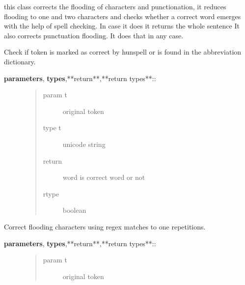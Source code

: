 \documentclass[letterpaper,10pt,english]{sphinxmanual}
\begin{document}
\label{API:module-norm.modules.flooding}

\begin{fulllineitems}
\label{API:norm.modules.flooding.Flooding}
this class corrects the flooding of characters and punctionation,
it reduces flooding to one and two characters and checks whether a correct word emerges
with the help of spell checking. In case it does it returns the whole sentence
It also corrects punctuation flooding. It does that in any case.

\begin{fulllineitems}
\label{API:norm.modules.flooding.Flooding.check_for_correctness}
Check if token is marked as correct by hunspell or is found in the abbreviation dictionary.
\begin{description}
\item[{\textbf{parameters}, \textbf{types},**return**,**return types**::}] \leavevmode\begin{quote}\begin{description}
\item[{param t}] \leavevmode
original token

\item[{type t}] \leavevmode
unicode string

\item[{return}] \leavevmode
word is correct word or not

\item[{rtype}] \leavevmode
boolean

\end{description}\end{quote}

\end{description}

\end{fulllineitems}


\begin{fulllineitems}
\label{API:norm.modules.flooding.Flooding.correct_flooding_to_one}
Correct flooding characters using regex matches to one repetitions.
\begin{description}
\item[{\textbf{parameters}, \textbf{types},**return**,**return types**::}] \leavevmode\begin{quote}\begin{description}
\item[{param t}] \leavevmode
original token


\end{description}
\end{quote}
\end{description}
\end{fulllineitems}
\end{fulllineitems}
\end{document}
